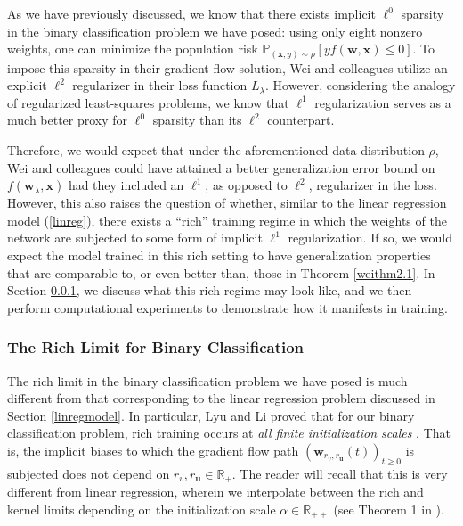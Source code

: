 \documentclass{article}
\begin{document}
As we have previously discussed, we know that there exists implicit $\ell^0$ sparsity in the binary classification problem we have posed: using only eight nonzero weights, one can minimize the population risk $\mathbb{P}_{(\boldsymbol{x}, y) \sim \rho} \left[ y f(\boldsymbol{w}, \boldsymbol{x}) \leq 0 \right]$. To impose this sparsity in their gradient flow solution, Wei and colleagues utilize an explicit $\ell^2$ regularizer in their loss function $L_{\lambda}$. However, considering the analogy of regularized least-squares problems, we know that $\ell^1$ regularization serves as a much better proxy for $\ell^0$ sparsity than its $\ell^2$ counterpart.

Therefore, we would expect that under the aforementioned data distribution $\rho$, Wei and colleagues could have attained a better generalization error bound on $f(\boldsymbol{w}_{\lambda}, \boldsymbol{x})$ had they included an $\ell^1$, as opposed to $\ell^2$, regularizer in the loss. However, this also raises the question of whether, similar to the linear regression model (\ref{linreg}), there exists a \enquote{rich} training regime in which the weights of the network are subjected to some form of implicit $\ell^1$ regularization. If so, we would expect the model trained in this rich setting to have generalization properties that are comparable to, or even better than, those in Theorem \ref{weithm2.1}. In Section \ref{richbinary}, we discuss what this rich regime may look like, and we then perform computational experiments to demonstrate how it manifests in training.

\subsubsection{The Rich Limit for Binary Classification}\label{richbinary}

The rich limit in the binary classification problem we have posed is much different from that corresponding to the linear regression problem discussed in Section \ref{linregmodel}. In particular, Lyu and Li proved that for our binary classification problem, rich training occurs at \textit{all finite initialization scales} \cite{lyu2019gradient}. That is, the implicit biases to which the gradient flow path $(\boldsymbol{w}_{r_v, r_{\boldsymbol{u}}}(t))_{t \geq 0}$ is subjected does not depend on $r_v, r_{\boldsymbol{u}} \in \mathbb{R}_{+}$. The reader will recall that this is very different from linear regression, wherein we interpolate between the rich and kernel limits depending on the initialization scale $\alpha \in \mathbb{R}_{++}$ (see Theorem 1 in \cite{woodworth2020kernel}). 
\end{document}
